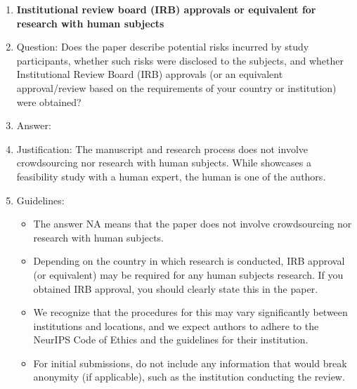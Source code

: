 \documentclass{article}
\begin{document}
\begin{enumerate}
\item {\bf Institutional review board (IRB) approvals or equivalent for research with human subjects}
    \item[] Question: Does the paper describe potential risks incurred by study participants, whether such risks were disclosed to the subjects, and whether Institutional Review Board (IRB) approvals (or an equivalent approval/review based on the requirements of your country or institution) were obtained?
    \item[] Answer: \answerNA{} %
    \item[] Justification: The manuscript and research process does not involve crowdsourcing nor research with human subjects. While  showcases a feasibility study with a human expert, the human is one of the authors.
    \item[] Guidelines:
    \begin{itemize}
        \item The answer NA means that the paper does not involve crowdsourcing nor research with human subjects.
        \item Depending on the country in which research is conducted, IRB approval (or equivalent) may be required for any human subjects research. If you obtained IRB approval, you should clearly state this in the paper. 
        \item We recognize that the procedures for this may vary significantly between institutions and locations, and we expect authors to adhere to the NeurIPS Code of Ethics and the guidelines for their institution. 
        \item For initial submissions, do not include any information that would break anonymity (if applicable), such as the institution conducting the review.
    \end{itemize}


\end{enumerate}
\end{document}
